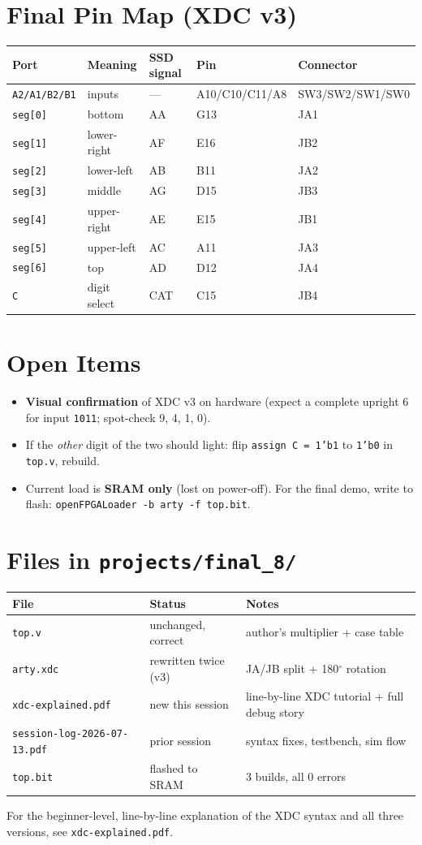 \documentclass[11pt]{article}
\begin{document}
\section{Final Pin Map (XDC v3)}
\begin{center}
\begin{tabular}{@{}lllll@{}}
\toprule
Port & Meaning & SSD signal & Pin & Connector \\
\midrule
\texttt{A2/A1/B2/B1} & inputs & --- & A10/C10/C11/A8 & SW3/SW2/SW1/SW0 \\
\texttt{seg[0]} & bottom       & AA & G13 & JA1 \\
\texttt{seg[1]} & lower-right  & AF & E16 & JB2 \\
\texttt{seg[2]} & lower-left   & AB & B11 & JA2 \\
\texttt{seg[3]} & middle       & AG & D15 & JB3 \\
\texttt{seg[4]} & upper-right  & AE & E15 & JB1 \\
\texttt{seg[5]} & upper-left   & AC & A11 & JA3 \\
\texttt{seg[6]} & top          & AD & D12 & JA4 \\
\texttt{C} & digit select      & CAT & C15 & JB4 \\
\bottomrule
\end{tabular}
\end{center}

\section{Open Items}
\begin{itemize}
  \item \textbf{Visual confirmation} of XDC v3 on hardware (expect a
    complete upright 6 for input \texttt{1011}; spot-check 9, 4, 1, 0).
  \item If the \emph{other} digit of the two should light: flip
    \texttt{assign C = 1'b1} to \texttt{1'b0} in \texttt{top.v},
    rebuild.
  \item Current load is \textbf{SRAM only} (lost on power-off). For the
    final demo, write to flash:
    \texttt{openFPGALoader -b arty -f top.bit}.
\end{itemize}

\section{Files in \texttt{projects/final\_8/}}
\begin{tabular}{@{}lll@{}}
\toprule
File & Status & Notes \\
\midrule
\texttt{top.v} & unchanged, correct & author's multiplier + case table \\
\texttt{arty.xdc} & rewritten twice (v3) & JA/JB split + 180$^\circ$ rotation \\
\texttt{xdc-explained.pdf} & new this session & line-by-line XDC tutorial + full debug story \\
\texttt{session-log-2026-07-13.pdf} & prior session & syntax fixes, testbench, sim flow \\
\texttt{top.bit} & flashed to SRAM & 3 builds, all 0 errors \\
\bottomrule
\end{tabular}

\vspace{1em}
\noindent For the beginner-level, line-by-line explanation of the XDC
syntax and all three versions, see \texttt{xdc-explained.pdf}.
\end{document}
